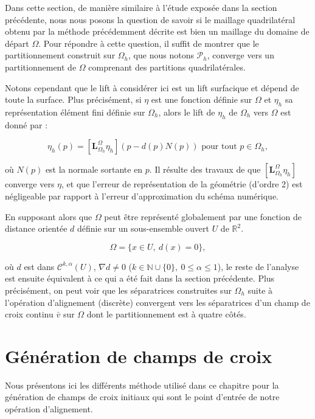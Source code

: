 Dans cette section, de manière similaire à l'étude exposée dans la section précédente, nous nous posons la question de savoir si le maillage quadrilatéral obtenu par la méthode précédemment décrite est bien un maillage du domaine de départ $\Omega$. Pour répondre à cette question, il suffit de montrer que le partitionnement construit sur $\Omega_h$, que nous notons $\mathcal{P}_h$, converge vers un partitionnement de $\Omega$ comprenant des partitions quadrilatérales.

Notons cependant que le lift à considérer ici est un lift surfacique et dépend de toute la surface. Plus précisément, si $\eta$ est une fonction définie sur $\Omega$ et $\eta_h$ sa représentation élément fini définie sur $\Omega_h$, alors le lift de $\eta_h$ de $\Omega_h$ vers $\Omega$ est donné par :

\begin{equation}
\eta_h(p)=[\mathbf{L}_{\Omega_h}^{\Omega}\eta_h](p-d(p)N(p))\text{ pour tout }p\in\Omega_h,
\end{equation}

où $N(p)$ est la normale sortante en $p$. Il résulte des travaux de \cite{dziuk1988finite} que $[\mathbf{L}_{\Omega_h}^{\Omega}\eta_h]$ converge vers $\eta$, et que l'erreur de représentation de la géométrie (d'ordre 2) est négligeable par rapport à l'erreur d'approximation du schéma numérique.

En supposant alors que $\Omega$ peut être représenté globalement par une fonction de distance orientée $d$ définie sur un sous-ensemble ouvert $U$ de $\mathbb{R}^2$.

\[
\Omega=\{x\in U,~d(x)=0\},
\]

où $d$ est dans $\mathcal{C}^{k,\alpha}(U)$, $\nabla d\neq 0$ ($k\in\mathbb{N}\cup\{0\},~0\leq\alpha\leq 1$), le reste de l'analyse est ensuite équivalent à ce qui a été fait dans la section précédente. Plus précisément, on peut voir que les séparatrices construites sur $\Omega_h$ suite à l'opération d'alignement (discrète) convergent vers les séparatrices d'un champ de croix continu $\bar{v}$ sur $\Omega$ dont le partitionnement est à quatre côtés.


\section{Génération de champs de croix}


Nous présentons ici les différents méthode utilisé dans ce chapitre pour la génération de champs de croix  initiaux qui sont le point d'entrée de notre opération d'alignement.

